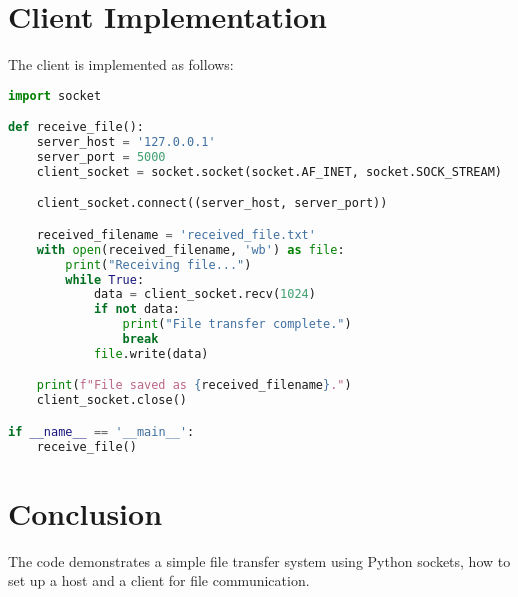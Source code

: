 \documentclass{article}
\begin{document}
\section{Client Implementation}
The client is implemented as follows:

\begin{lstlisting}[language=Python, caption=Client Code]
import socket

def receive_file():
    server_host = '127.0.0.1'  
    server_port = 5000
    client_socket = socket.socket(socket.AF_INET, socket.SOCK_STREAM)

    client_socket.connect((server_host, server_port))

    received_filename = 'received_file.txt'
    with open(received_filename, 'wb') as file:
        print("Receiving file...")
        while True:
            data = client_socket.recv(1024)
            if not data:
                print("File transfer complete.")
                break
            file.write(data)

    print(f"File saved as {received_filename}.")
    client_socket.close()

if __name__ == '__main__':
    receive_file()
\end{lstlisting}

\section{Conclusion}
The code demonstrates a simple file transfer system using Python sockets, how to set up a host and a client for file communication. 
\end{document}
